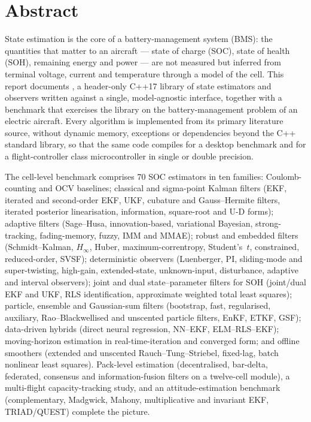 \chapter*{Abstract}

State estimation is the core of a battery-management system (BMS): the quantities that
matter to an aircraft --- state of charge (SOC), state of health (SOH), remaining energy
and power --- are not measured but inferred from terminal voltage, current and temperature
through a model of the cell. This report documents \estkit, a header-only C++17 library of
state estimators and observers written against a single, model-agnostic interface, together
with a benchmark that exercises the library on the battery-management problem of an electric
aircraft. Every algorithm is implemented from its primary literature source, without dynamic
memory, exceptions or dependencies beyond the C++ standard library, so that the same code
compiles for a desktop benchmark and for a flight-controller class microcontroller in single
or double precision.

The cell-level benchmark comprises 70 SOC estimators in ten families: Coulomb-counting and
OCV baselines; classical and sigma-point Kalman filters (EKF, iterated and second-order EKF,
UKF, cubature and Gauss--Hermite filters, iterated posterior linearisation, information,
square-root and U-D forms); adaptive filters (Sage--Husa, innovation-based, variational
Bayesian, strong-tracking, fading-memory, fuzzy, IMM and MMAE); robust and embedded filters
(Schmidt--Kalman, $H_\infty$, Huber, maximum-correntropy, Student's~$t$, constrained,
reduced-order, SVSF); deterministic observers (Luenberger, PI, sliding-mode and
super-twisting, high-gain, extended-state, unknown-input, disturbance, adaptive and interval
observers); joint and dual state--parameter filters for SOH (joint/dual EKF and UKF, RLS
identification, approximate weighted total least squares); particle, ensemble and
Gaussian-sum filters (bootstrap, fast, regularised, auxiliary, Rao--Blackwellised and
unscented particle filters, EnKF, ETKF, GSF); data-driven hybrids (direct neural regression,
NN--EKF, ELM--RLS--EKF); moving-horizon estimation in real-time-iteration and converged form;
and offline smoothers (extended and unscented Rauch--Tung--Striebel, fixed-lag, batch
nonlinear least squares). Pack-level estimation (decentralised, bar-delta, federated,
consensus and information-fusion filters on a twelve-cell module), a multi-flight
capacity-tracking study, and an attitude-estimation benchmark (complementary, Madgwick,
Mahony, multiplicative and invariant EKF, TRIAD/QUEST) complete the picture.

